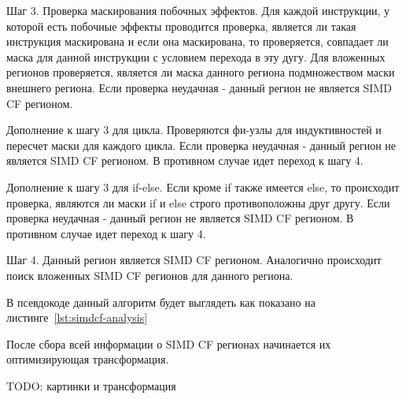 Шаг 3. Проверка маскирования побочных эффектов. Для каждой инструкции, у которой
есть побочные эффекты проводится проверка, является ли такая инструкция
маскирована и если она маскирована, то проверяется, совпадает ли маска для
данной инструкции с условием перехода в эту дугу. Для вложенных регионов
проверяется, является ли маска данного региона подмножеством маски внешнего
региона. Если проверка неудачная - данный регион не является SIMD CF регионом.

Дополнение к шагу 3 для цикла. Проверяются фи-узлы для индуктивностей и пересчет
маски для каждого цикла. Если проверка неудачная - данный регион не является
SIMD CF регионом. В противном случае идет переход к шагу 4.

Дополнение к шагу 3 для if-else. Если кроме if также имеется else, то происходит
проверка, являются ли маски if и else строго противоположны друг другу. Если
проверка неудачная - данный регион не является SIMD CF регионом. В противном
случае идет переход к шагу 4.

Шаг 4. Данный регион является SIMD CF регионом. Аналогично происходит поиск
вложенных SIMD CF регионов для данного региона.

В псевдокоде данный алгоритм будет выглядеть как показано на листинге~\ref{lst:simdcf-analysis}

После сбора всей информации о SIMD CF регионах начинается их оптимизирующая трансформация.

TODO: картинки и трансформация

\FloatBarrier